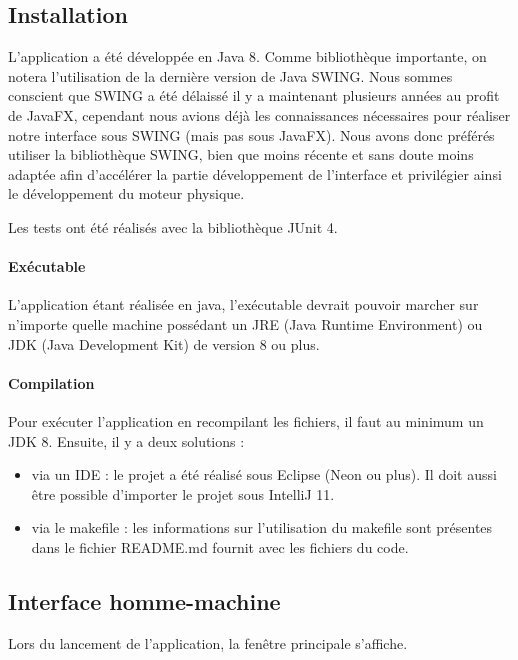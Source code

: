\documentclass{report}
\begin{document}
\subsection{Installation}

L'application a été développée en Java 8. Comme bibliothèque importante, on notera l'utilisation de la dernière version de Java SWING. Nous sommes conscient que SWING a été délaissé il y a maintenant plusieurs années au profit de JavaFX, cependant nous avions déjà les connaissances nécessaires pour réaliser notre interface sous SWING (mais pas sous JavaFX). Nous avons donc préférés utiliser la bibliothèque SWING, bien que moins récente et sans doute moins adaptée afin d'accélérer la partie développement de l'interface et privilégier ainsi le développement du moteur physique.

Les tests ont été réalisés avec la bibliothèque JUnit 4.

\paragraph*{Exécutable} L'application étant réalisée en java, l'exécutable devrait pouvoir marcher sur n'importe quelle machine possédant un JRE (Java Runtime Environment) ou JDK (Java Development Kit) de version 8 ou plus.

\paragraph*{Compilation} Pour exécuter l'application en recompilant les fichiers, il faut au minimum un JDK 8. Ensuite, il y a deux solutions :
\begin{itemize}
\item via un IDE : le projet a été réalisé sous Eclipse (Neon ou plus). Il doit aussi être possible d'importer le projet sous IntelliJ 11.
\item via le makefile : les informations sur l'utilisation du makefile sont présentes dans le fichier README.md fournit avec les fichiers du code.
\end{itemize}

\newpage
\subsection{Interface homme-machine}

Lors du lancement de l’application, la fenêtre principale s’affiche.
\end{document}
